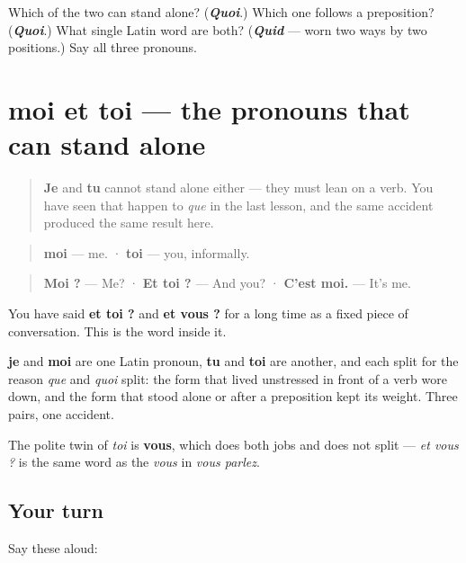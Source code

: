 \begin{tcolorbox}[breakable,colback=teal!4,colframe=teal!35!black,title={Before you move on}]
Which of the two can stand alone? (\emph{\textbf{Quoi}}.) Which one follows a preposition? (\emph{\textbf{Quoi}}.) What single Latin word are both? (\emph{\textbf{Quid}} — worn two ways by two positions.) Say all three pronouns.
\end{tcolorbox}
\section[moi et toi]{moi et toi — the pronouns that can stand alone}

\label{lesson:FR-C39-moi-toi}



\begin{quote}
\textbf{Je} and \textbf{tu} cannot stand alone either — they must lean on a verb. You have seen that happen to \emph{que} in the last lesson, and the same accident produced the same result here.
\end{quote}

\begin{cousinweb}
\begin{quote}
\textbf{moi} — me. · \textbf{toi} — you, informally.
\end{quote}

\begin{quote}
\textbf{Moi ?} — Me? · \textbf{Et toi ?} — And you? · \textbf{C'est moi.} — It's me.
\end{quote}

You have said \textbf{et toi ?} and \textbf{et vous ?} for a long time as a fixed piece of conversation. This is the word inside it.

\textbf{je} and \textbf{moi} are one Latin pronoun, \textbf{tu} and \textbf{toi} are another, and each split for the reason \emph{que} and \emph{quoi} split: the form that lived unstressed in front of a verb wore down, and the form that stood alone or after a preposition kept its weight. Three pairs, one accident.

The polite twin of \emph{toi} is \textbf{vous}, which does both jobs and does not split — \emph{et vous ?} is the same word as the \emph{vous} in \emph{vous parlez}.
\end{cousinweb}

\subsection*{Your turn}
Say these aloud:

